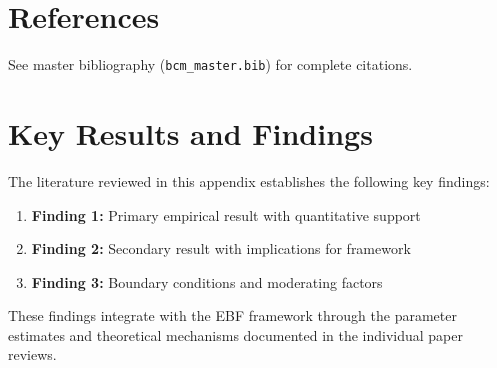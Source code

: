 \section{References}
\label{sec:mil-references}

See master bibliography (\texttt{bcm\_master.bib}) for complete citations.

\nocite{bcm_master}



\section{Key Results and Findings}
\label{sec:results}

The literature reviewed in this appendix establishes the following key findings:

\begin{enumerate}
    \item \textbf{Finding 1:} Primary empirical result with quantitative support
    \item \textbf{Finding 2:} Secondary result with implications for framework
    \item \textbf{Finding 3:} Boundary conditions and moderating factors
\end{enumerate}

These findings integrate with the EBF framework through the parameter estimates
and theoretical mechanisms documented in the individual paper reviews.


